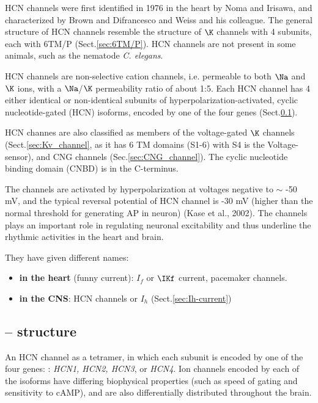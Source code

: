 HCN channels were first identified in 1976 in the heart by
Noma and Irisawa, and characterized by Brown and
Difrancesco and Weiss and his colleague. The general structure of HCN channels
resemble the structure of $\K$ channels with 4 subunits, each with 6TM/P
(Sect.\ref{sec:6TM/P}).
HCN channels are not present in some animals, such as the nematode {\it C.
elegans}.

HCN channels are non-selective cation channels, i.e. permeable to both $\Na$ and
$\K$ ions, with a $\Na$/$\K$ permeability ratio of about 1:5.
Each HCN channel has 4 either identical or non-identical subunits of
hyperpolarization-activated, cyclic nucleotide-gated (HCN) isoforms, encoded by
one of the four genes (Sect.\ref{sec:HCN-channel-structure}).


HCN channes are also classified as members of the voltage-gated $\K$ channels
(Sect.\ref{sec:Kv_channel}, as it has 6 TM domains (S1-6) with S4 is the
Voltage-sensor), and CNG channels (Sec.\ref{sec:CNG_channel}). The cyclic
nucleotide binding domain (CNBD) is in the C-terminus.


The channels are activated by hyperpolarization at voltages negative to $\sim $
-50 mV, and the typical reversal potential of HCN channel is -30
mV (higher than the normal threshold for generating AP in neuron) (Kase et al.,
2002).
The channels plays an important role in regulating neuronal excitability and
thus underline the rhythmic activities in the heart and brain.

They have given different names:
\begin{itemize}
  \item {\bf in the heart} (funny current): $I_f$ or $\IKf$ current, pacemaker
  channels.

  \item {\bf in the CNS}: HCN channels or $I_h$ (Sect.\ref{sec:Ih-current})
  
\end{itemize}

\subsection{-- structure}
\label{sec:HCN-channel-structure}

An HCN channel as a tetramer, in which each subunit is encoded by one of the
four genes: : {\it HCN1, HCN2, HCN3}, or {\it HCN4}.
Ion channels encoded by each of the isoforms have differing biophysical
properties (such as speed of gating and sensitivity to cAMP), and are also
differentially distributed throughout the brain.


